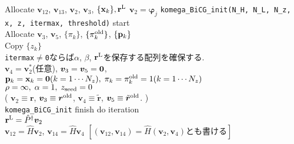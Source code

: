 \documentclass[12pt,titlepage]{jarticle}
\renewenvironment{leftbar}{%
  \def\FrameCommand{\vrule width 1pt \hspace{0pt}}%
  \MakeFramed {\advance\hsize-\width \FrameRestore}}%
 {\endMakeFramed}
\begin{document}
\noindent
Allocate ${\boldsymbol v}_{1 2}$, ${\boldsymbol v}_{1 3}$, 
${\boldsymbol v}_2$, ${\boldsymbol v}_3$, $\{{\bf x}_k\}, {\bf r}^{\rm L}$
${\boldsymbol v}_2 = {\boldsymbol \varphi_j}$
\vspace{-1em}
\begin{leftbar}
  \noindent
  \verb|komega_BiCG_init(N_H, N_L, N_z, x, z, itermax, threshold)| start
  \\ \hspace{0.5cm}
  Allocate ${\boldsymbol v}_3$, ${\boldsymbol v}_5$, $\{\pi_k\}$, $\{\pi_k^{\rm old}\}$, $\{{\bf p}_k\}$
  \\ \hspace{0.5cm}
  Copy $\{z_k\}$
  \\ \hspace{0.5cm}
  \verb|itermax|$\neq$\verb|0|ならば$\alpha$, $\beta$, ${\bf r}^{\rm L}$を保存する配列を確保する.
  \\ \hspace{0.5cm}
  ${\boldsymbol v}_4 = {\boldsymbol v}_2^*$(任意),
  ${\boldsymbol v}_3 = {\boldsymbol v}_5 = {\bf 0}$,
  \\ \hspace{0.5cm}
  ${\bf p}_{k} = {\bf x}_k = {\bf 0}(k=1 \cdots N_z),\; \pi_k=\pi_k^{\rm old} = 1(k=1 \cdots N_z)$ 
  \\ \hspace{0.5cm}
  $\rho = \infty,\; \alpha = 1,\; z_{\rm seed}=0$ 
  \\ \hspace{0.5cm}
  (
  ${\boldsymbol v}_2 \equiv {\boldsymbol r}$, 
  ${\boldsymbol v}_3 \equiv {\boldsymbol r}^{\rm old}$,
  ${\boldsymbol v}_4 \equiv {\tilde {\boldsymbol r}}$, 
  ${\boldsymbol v}_5 \equiv {\tilde {\boldsymbol r}}^{\rm old}$. )
  \\
  \verb|komega_BiCG_init| finish
\end{leftbar}
\vspace{-1em}
\noindent
do iteration
\\\hspace{0.5cm}
${\bf r}^{\rm L} = {\hat P}^\dagger {\boldsymbol v}_2$
\\\hspace{0.5cm}
${\boldsymbol v}_{1 2} = {\hat H} {\boldsymbol v}_2$, 
${\boldsymbol v}_{1 4} = {\hat H} {\boldsymbol v}_4$  
$ [ ({\boldsymbol v}_{1 2}, {\boldsymbol v}_{1 4}) = {\hat H}
  ({\boldsymbol v}_2, {\boldsymbol v}_4)とも書ける]$
\vspace{-1em}
\end{document}
